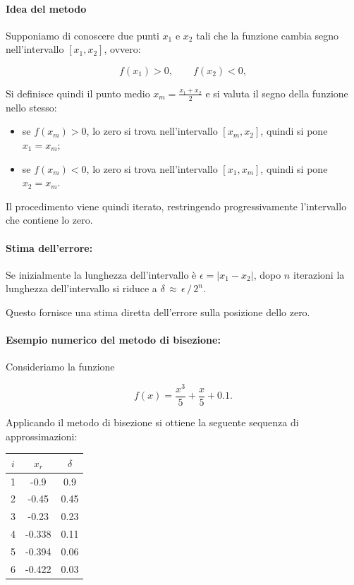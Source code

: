 \paragraph{Idea del metodo}

Supponiamo di conoscere due punti \( x_1 \) e \( x_2 \) tali che la funzione cambia segno nell'intervallo \([x_1, x_2]\), ovvero:

\[
f(x_1) > 0, \qquad f(x_2) < 0,
\]

Si definisce quindi il punto medio $x_m = \frac{x_1 + x_2}{2}$ e si valuta il segno della funzione nello stesso:

\begin{itemize}
	\item se \( f(x_m) > 0 \), lo zero si trova nell'intervallo \([x_m, x_2]\), quindi si pone \( x_1 = x_m \);
	\item se \( f(x_m) < 0 \), lo zero si trova nell'intervallo \([x_1, x_m]\), quindi si pone \( x_2 = x_m \).
\end{itemize}

Il procedimento viene quindi iterato, restringendo progressivamente l'intervallo che contiene lo zero.

\paragraph{Stima dell'errore: }

Se inizialmente la lunghezza dell'intervallo è $\epsilon = |x_1 - x_2|$, dopo $n$ iterazioni la lunghezza dell'intervallo si riduce a $\delta \,\approx\,\epsilon\,/\,2^n$.

Questo fornisce una stima diretta dell'errore sulla posizione dello zero.

\paragraph{Esempio numerico del metodo di bisezione: }

Consideriamo la funzione

\[
f(x) = \frac{x^3}{5} + \frac{x}{5} + 0.1.
\]

Applicando il metodo di bisezione si ottiene la seguente sequenza di approssimazioni:

\begin{center}
	\begin{tabular}{c c c}
		\hline
		$i$ & $x_r$ & $\delta$ \\
		\hline
		1 & -0.9   & 0.9  \\
		2 & -0.45  & 0.45 \\
		3 & -0.23  & 0.23 \\
		4 & -0.338 & 0.11 \\
		5 & -0.394 & 0.06 \\
		6 & -0.422 & 0.03 \\
		\hline
	\end{tabular}
\end{center}

